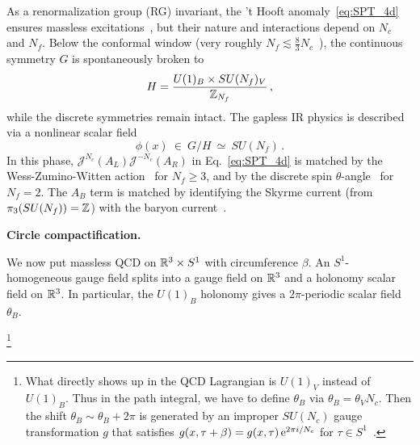 \documentclass[
 reprint,







nofootinbib,


 amsmath,amssymb,
 aps,
 prd






tightenlines
]{revtex4-2}
\begin{document}
As a renormalization group (RG) invariant, the 't Hooft anomaly~\eqref{eq:SPT_4d} ensures massless excitations~\cite{Frishman:1980dq,Coleman:1982yg}, but their nature and interactions depend on $N_c$ and $N_f$.
Below the conformal window (very roughly
$N_f\lesssim\frac{8}{3}N_c$~\cite{LatticeStrongDynamics:2018hun,Kuti:2022ldb,Ingoldby:2023mtf,Hasenfratz:2023wbr,Hasenfratz:2024fad,Bergner:2025yke}),
the continuous symmetry $G$ is spontaneously broken to
\begin{equation}
    H = \frac{U(1)_B\times SU(N_f)_V}{\mathbb{Z}_{N_f}}\,,
\end{equation}
while the discrete symmetries remain intact.
The gapless IR physics is described via a nonlinear scalar field
\begin{equation}\label{eq:U(x)}
    \phi(x) \ \in\ G/H\ \simeq\ SU(N_f)\,.
\end{equation}
In this phase, $\mathcal{J}^{N_c}(A_L)\mathcal{J}^{-N_c}(A_R)$ in Eq.~\eqref{eq:SPT_4d} is matched by the Wess-Zumino-Witten action~\cite{Witten:1983tw} for $N_f\ge3$, and by the discrete spin $\theta$-angle~\cite{Witten:1983tw} for $N_f=2$.
The $A_B$ term is matched by identifying the Skyrme current (from $\pi_3(SU(N_f)) = \mathbb{Z}$) with the baryon current~\cite{Witten:1983tx}.



{\bf Circle compactification.}


We now put massless QCD on $\mathbb{R}^3\times S^1$ with circumference $\beta$.
An $S^1$-homogeneous gauge field splits into a gauge field on $\mathbb{R}^3$
and a holonomy scalar field on $\mathbb{R}^3$. In particular, the $U(1)_B$
holonomy gives a $2\pi$-periodic scalar field $\theta_B$.

\footnote{What directly shows up in the QCD Lagrangian is $U(1)_V$ instead of $U(1)_B$. Thus in
the path integral, we have to define $\theta_B$ via $\theta_B =\theta_VN_c$.
Then the shift
$\theta_B\sim\theta_B+2\pi$ is generated by an improper $SU(N_c)$ gauge transformation $g$ that
satisfies $g(x,\tau+\beta) = g(x,\tau)\,\mathrm{e}^{2\pi i/N_c}$ for $\tau\in
S^1$~\cite{Roberge:1986mm}.}
\end{document}

